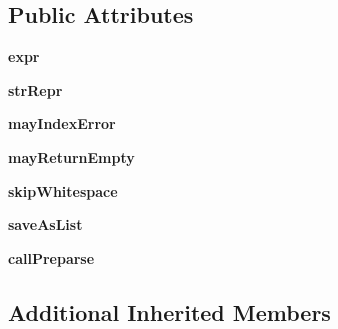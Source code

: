 \subsection*{Public Attributes}
\begin{DoxyCompactItemize}
\item 
\mbox{\label{classpkg__resources_1_1__vendor_1_1pyparsing_1_1_parse_element_enhance_a34e02b3404b2a545ca1be8b522758896}} 
{\bfseries expr}
\item 
\mbox{\label{classpkg__resources_1_1__vendor_1_1pyparsing_1_1_parse_element_enhance_a8921a466c253eccd736c6033f3a8aa4d}} 
{\bfseries str\+Repr}
\item 
\mbox{\label{classpkg__resources_1_1__vendor_1_1pyparsing_1_1_parse_element_enhance_a55125656b13bd5297f6b4fd2bc771481}} 
{\bfseries may\+Index\+Error}
\item 
\mbox{\label{classpkg__resources_1_1__vendor_1_1pyparsing_1_1_parse_element_enhance_a8823f3f13727503ad0b1dcbdf236d95b}} 
{\bfseries may\+Return\+Empty}
\item 
\mbox{\label{classpkg__resources_1_1__vendor_1_1pyparsing_1_1_parse_element_enhance_a902e9037c0ac276951b44ca23ffa7876}} 
{\bfseries skip\+Whitespace}
\item 
\mbox{\label{classpkg__resources_1_1__vendor_1_1pyparsing_1_1_parse_element_enhance_a76d9c4177447649dfbc323acfed06ae3}} 
{\bfseries save\+As\+List}
\item 
\mbox{\label{classpkg__resources_1_1__vendor_1_1pyparsing_1_1_parse_element_enhance_af6e15e2325acca7b00b11cd3eeddcbc6}} 
{\bfseries call\+Preparse}
\end{DoxyCompactItemize}
\subsection*{Additional Inherited Members}


